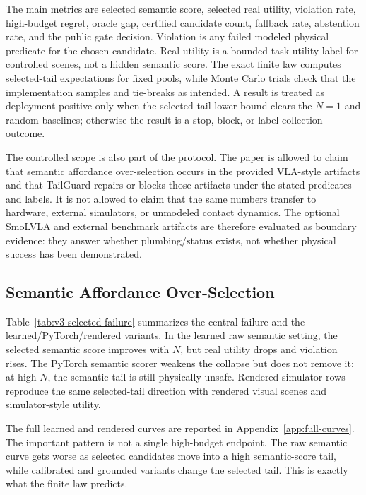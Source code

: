 \documentclass{article}
\begin{document}
The main metrics are selected semantic score, selected real utility, violation rate, high-budget regret, oracle gap, certified candidate count, fallback rate, abstention rate, and the public gate decision. Violation is any failed modeled physical predicate for the chosen candidate. Real utility is a bounded task-utility label for controlled scenes, not a hidden semantic score. The exact finite law computes selected-tail expectations for fixed pools, while Monte Carlo trials check that the implementation samples and tie-breaks as intended. A result is treated as deployment-positive only when the selected-tail lower bound clears the $N=1$ and random baselines; otherwise the result is a stop, block, or label-collection outcome.

The controlled scope is also part of the protocol. The paper is allowed to claim that semantic affordance over-selection occurs in the provided VLA-style artifacts and that TailGuard repairs or blocks those artifacts under the stated predicates and labels. It is not allowed to claim that the same numbers transfer to hardware, external simulators, or unmodeled contact dynamics. The optional SmoLVLA and external benchmark artifacts are therefore evaluated as boundary evidence: they answer whether plumbing/status exists, not whether physical success has been demonstrated.

\subsection{Semantic Affordance Over-Selection}

Table~\ref{tab:v3-selected-failure} summarizes the central failure and the learned/PyTorch/rendered variants. In the learned raw semantic setting, the selected semantic score improves with $N$, but real utility drops and violation rises. The PyTorch semantic scorer weakens the collapse but does not remove it: at high $N$, the semantic tail is still physically unsafe. Rendered simulator rows reproduce the same selected-tail direction with rendered visual scenes and simulator-style utility.



The full learned and rendered curves are reported in Appendix~\ref{app:full-curves}. The important pattern is not a single high-budget endpoint. The raw semantic curve gets worse as selected candidates move into a high semantic-score tail, while calibrated and grounded variants change the selected tail. This is exactly what the finite law predicts.
\end{document}
